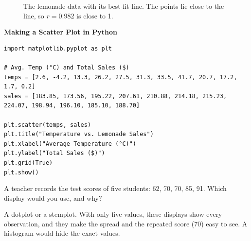 \begin{figure}[H]
    \centering
    \caption{The lemonade data with its best-fit line. The points lie close to the line, so $r = 0.982$ is close to 1.}
    \label{fig:bestfit}
\end{figure}

\textbf{Making a Scatter Plot in Python}

\begin{verbatim}
import matplotlib.pyplot as plt

# Avg. Temp (°C) and Total Sales ($)
temps = [2.6, -4.2, 13.3, 26.2, 27.5, 31.3, 33.5, 41.7, 20.7, 17.2, 1.7, 0.2]
sales = [183.85, 173.56, 195.22, 207.61, 210.88, 214.18, 215.23, 224.07, 198.94, 196.10, 185.10, 188.70]

plt.scatter(temps, sales)
plt.title("Temperature vs. Lemonade Sales")
plt.xlabel("Average Temperature (°C)")
plt.ylabel("Total Sales ($)")
plt.grid(True)
plt.show()
\end{verbatim}

\begin{Exercise}[label=dviz1, title=Choosing a display]
A teacher records the test scores of five students: 62, 70, 70, 85, 91. Which display would you use, and why?
\end{Exercise}
\begin{Answer}[ref=dviz1]
A dotplot or a stemplot. With only five values, these displays show every observation, and they make the spread and the repeated score (70) easy to see. A histogram would hide the exact values.
\end{Answer}

